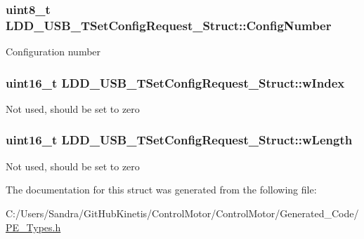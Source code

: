 \subsubsection[{\texorpdfstring{Config\+Number}{ConfigNumber}}]{\setlength{\rightskip}{0pt plus 5cm}uint8\+\_\+t L\+D\+D\+\_\+\+U\+S\+B\+\_\+\+T\+Set\+Config\+Request\+\_\+\+Struct\+::\+Config\+Number}\hypertarget{struct_l_d_d___u_s_b___t_set_config_request___struct_a9a545d7858a7ee85dbe37eaf2b4b7e01}{}\label{struct_l_d_d___u_s_b___t_set_config_request___struct_a9a545d7858a7ee85dbe37eaf2b4b7e01}
Configuration number 
\subsubsection[{\texorpdfstring{w\+Index}{wIndex}}]{\setlength{\rightskip}{0pt plus 5cm}uint16\+\_\+t L\+D\+D\+\_\+\+U\+S\+B\+\_\+\+T\+Set\+Config\+Request\+\_\+\+Struct\+::w\+Index}\hypertarget{struct_l_d_d___u_s_b___t_set_config_request___struct_ad2aa2851b128777e842b2ac796d2f664}{}\label{struct_l_d_d___u_s_b___t_set_config_request___struct_ad2aa2851b128777e842b2ac796d2f664}
Not used, should be set to zero 
\subsubsection[{\texorpdfstring{w\+Length}{wLength}}]{\setlength{\rightskip}{0pt plus 5cm}uint16\+\_\+t L\+D\+D\+\_\+\+U\+S\+B\+\_\+\+T\+Set\+Config\+Request\+\_\+\+Struct\+::w\+Length}\hypertarget{struct_l_d_d___u_s_b___t_set_config_request___struct_a66312977eb5816459d0201a2bacaf9b5}{}\label{struct_l_d_d___u_s_b___t_set_config_request___struct_a66312977eb5816459d0201a2bacaf9b5}
Not used, should be set to zero 

The documentation for this struct was generated from the following file\+:\begin{DoxyCompactItemize}
\item 
C\+:/\+Users/\+Sandra/\+Git\+Hub\+Kinetis/\+Control\+Motor/\+Control\+Motor/\+Generated\+\_\+\+Code/\hyperlink{_p_e___types_8h}{P\+E\+\_\+\+Types.\+h}\end{DoxyCompactItemize}
